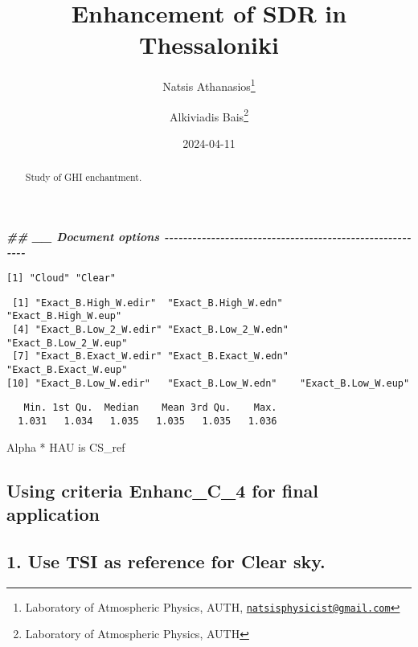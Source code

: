 \documentclass[
  10pt,
  a4paper,oneside]{article}
\title{Enhancement of SDR in Thessaloniki}
\author{Natsis Athanasios\footnote{Laboratory of Atmospheric Physics, AUTH, \href{mailto:natsisphysicist@gmail.com}{\nolinkurl{natsisphysicist@gmail.com}}} \and Alkiviadis Bais\footnote{Laboratory of Atmospheric Physics, AUTH}}
\date{2024-04-11}
\newenvironment{Shaded}{\begin{snugshade}}{\end{snugshade}}
\newcommand{\DocumentationTok}[1]{\textcolor[rgb]{0.56,0.35,0.01}{\textbf{\textit{#1}}}}
\begin{document}
\maketitle
\begin{abstract}
Study of GHI enchantment.
\end{abstract}

{
\hypersetup{linkcolor=}
\setcounter{tocdepth}{4}
\tableofcontents
}
\begin{Shaded}
\begin{Highlighting}[]
\DocumentationTok{\#\# \_\_ Document options {-}{-}{-}{-}{-}{-}{-}{-}{-}{-}{-}{-}{-}{-}{-}{-}{-}{-}{-}{-}{-}{-}{-}{-}{-}{-}{-}{-}{-}{-}{-}{-}{-}{-}{-}{-}{-}{-}{-}{-}{-}{-}{-}{-}{-}{-}{-}{-}{-}{-}{-}{-}{-}{-}{-}{-}{-}}
\end{Highlighting}
\end{Shaded}

\begin{verbatim}
[1] "Cloud" "Clear"
\end{verbatim}

\begin{verbatim}
 [1] "Exact_B.High_W.edir"  "Exact_B.High_W.edn"   "Exact_B.High_W.eup"  
 [4] "Exact_B.Low_2_W.edir" "Exact_B.Low_2_W.edn"  "Exact_B.Low_2_W.eup" 
 [7] "Exact_B.Exact_W.edir" "Exact_B.Exact_W.edn"  "Exact_B.Exact_W.eup" 
[10] "Exact_B.Low_W.edir"   "Exact_B.Low_W.edn"    "Exact_B.Low_W.eup"   
\end{verbatim}

\begin{verbatim}
   Min. 1st Qu.  Median    Mean 3rd Qu.    Max. 
  1.031   1.034   1.035   1.035   1.035   1.036 
\end{verbatim}

Alpha * HAU is CS\_ref

\hypertarget{using-criteria-enhanc_c_4-for-final-application}{%
\subsection{\texorpdfstring{Using criteria \textbf{Enhanc\_C\_4} for final application}{Using criteria Enhanc\_C\_4 for final application}}\label{using-criteria-enhanc_c_4-for-final-application}}

\hypertarget{use-tsi-as-reference-for-clear-sky.}{%
\subsection{1. Use TSI as reference for Clear sky.}\label{use-tsi-as-reference-for-clear-sky.}}
\end{document}
